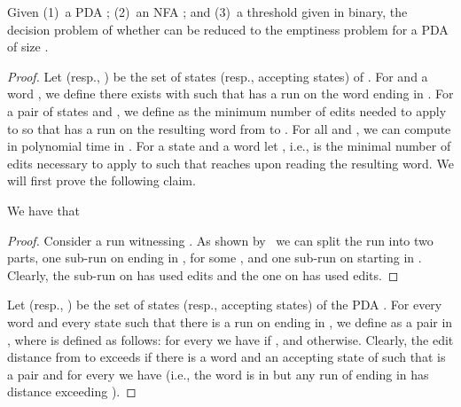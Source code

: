 \documentclass{CSML}
\newcommand{\aut}{\mathcal{A}}
\begin{document}
\begin{lem}
Given (1)~a PDA ; (2)~an NFA ; and (3)~a threshold  given in binary, 
the decision problem of whether  can be reduced to the emptiness problem 
for a PDA of size .
\label{l:EDtoPDAreduction}
\end{lem}
\newcommand{\Impact}{\mathsf{Impact}}
\begin{proof}
\newcommand{\QN}{Q_{N}}
\newcommand{\FN}{F_{N}}
\newcommand{\QP}{Q_{P}}
\newcommand{\FP}{F_{P}}
\newcommand{\SP}{S_{P}}
\newcommand{\SN}{S_{N}}
\newcommand{\autImpact}{{\aut_{I}}}
\newcommand{\lpair}[1]{\langle #1 \rangle}
\newcommand{\deltaI}{\delta_I}
Let  (resp., ) be the set of states (resp., accepting states) of .
For  and a word , we define 
 there exists  with  such that  has a run on the word  ending in .
For a pair of states  and , we define   as the minimum number of edits needed to apply to  
so that  has a run on the resulting word from  to .
For all  and , we
can compute  in polynomial time in .
For a state  and a word  let , i.e.,  is the minimal number of edits necessary 
to apply to  such that  reaches   upon reading the resulting word.
We will  first prove the following claim.

\begin{clm}\label{cla:letter-by-letter}We have that \end{clm}
\begin{proof}
Consider a run witnessing .
 As shown by~\cite{WF74} we can split the run into two parts, one sub-run on  ending in , for some , and one sub-run on  starting in . Clearly, the sub-run on  has used  edits and the one on  has used  edits.
\end{proof}


Let  (resp., ) be the set of states (resp., accepting states) of the PDA .
For every word  and every state  such that there is a run on  ending in , we define 
 as a pair 
 in , where  is defined as follows:
for every  we have  if , and 
 otherwise. 
Clearly, the edit distance from  to  exceeds  if there is a 
word  and an accepting state  of  such that  is a pair 
and for every  we have 
(i.e., the word  is in  but any run of  ending in  has distance exceeding ).
 

\end{proof}
\end{document}

